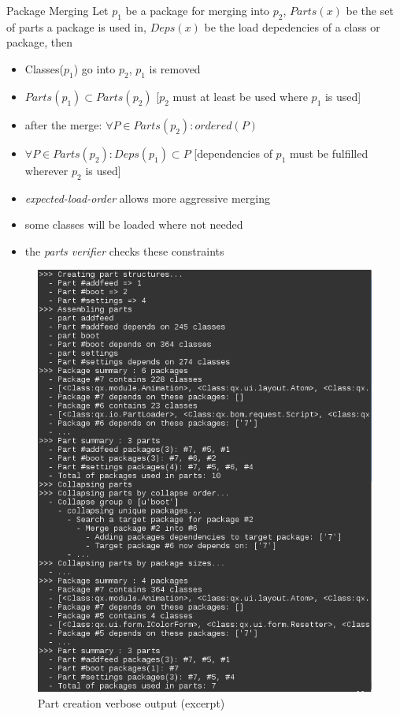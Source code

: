 \documentclass[final]{beamer}
\newlength{\onecolwid}
\begin{document}
\begin{frame}[t]
\begin{columns}[t]
\begin{column}{\onecolwid}
      \begin{block}{Package Merging}
        Let $p_1$ be a package for merging into $p_2$, $Parts(x)$ be
        the set of parts a package is used in, $Deps(x)$ be the load depedencies of
        a class or package, then
        \begin{itemize}
          \item Classes($p_1$) go into $p_2$, $p_1$ is removed
          \item $Parts(p_1) \subset Parts(p_2)$  [$p_2$ must at least be used where $p_1$ is
            used]
          \item after the merge: $\forall P \in Parts(p_2): ordered(P)$
          \item $\forall P \in Parts(p_2): Deps(p_1) \subset P$
            [dependencies of $p_1$ must be fulfilled wherever $p_2$ is used]
          \item \textit{expected-load-order} allows more aggressive merging
          \item some classes will be loaded where not needed
          \item the \textit{parts verifier} checks these constraints
        \end{itemize}
        \begin{figure}
          \begin{center}
            \includegraphics[width=\onecolwid]{g_parts_log.png}
            \caption{Part creation verbose output (excerpt)}
            \label{fig:corrSubsys}
          \end{center}
        \end{figure}
      \end{block}


\end{column}
\end{columns}
\end{frame}
\end{document}
